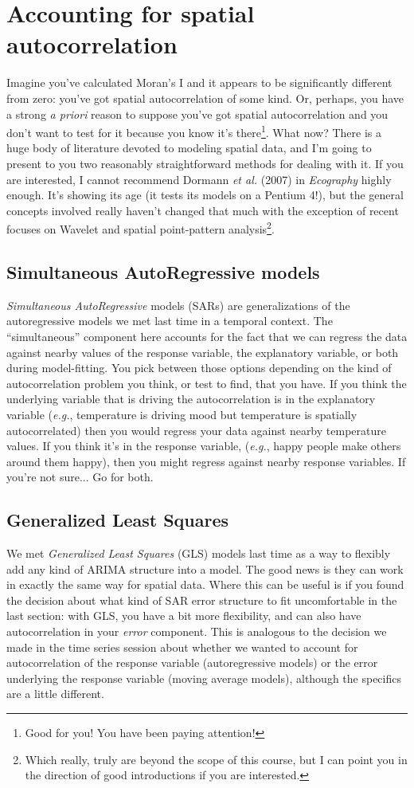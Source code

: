 \section{Accounting for spatial autocorrelation}
Imagine you've calculated Moran's I and it appears to be significantly
different from zero: you've got spatial autocorrelation of some
kind. Or, perhaps, you have a strong \emph{a priori} reason to suppose
you've got spatial autocorrelation and you don't want to test for it
because you know it's there\footnote{Good for you! You have been
  paying attention!}. What now? There is a huge body of literature
devoted to modeling spatial data, and I'm going to present to you two
reasonably straightforward methods for dealing with it. If you are
interested, I cannot recommend Dormann \emph{et al.} (2007) in
\emph{Ecography} highly enough. It's showing its age (it tests its
models on a Pentium 4!), but the general concepts involved really
haven't changed that much with the exception of recent focuses on
Wavelet and spatial point-pattern analysis\footnote{Which really,
  truly are beyond the scope of this course, but I can point you in
  the direction of good introductions if you are interested.}.

\subsection{Simultaneous AutoRegressive models}
\emph{Simultaneous AutoRegressive} models (SARs) are generalizations
of the autoregressive models we met last time in a temporal
context. The ``simultaneous'' component here accounts for the fact
that we can regress the data against nearby values of the response
variable, the explanatory variable, or both during model-fitting. You
pick between those options depending on the kind of autocorrelation
problem you think, or test to find, that you have. If you think the
underlying variable that is driving the autocorrelation is in the
explanatory variable (\emph{e.g.}, temperature is driving mood but
temperature is spatially autocorrelated) then you would regress your
data against nearby temperature values. If you think it's in the
response variable, (\emph{e.g.}, happy people make others around them
happy), then you might regress against nearby response variables. If
you're not sure... Go for both.

\subsection{Generalized Least Squares}
We met \emph{Generalized Least Squares} (GLS) models last time as a way to
flexibly add any kind of ARIMA structure into a model. The good news
is they can work in exactly the same way for spatial data. Where this
can be useful is if you found the decision about what kind of SAR
error structure to fit uncomfortable in the last section: with GLS,
you have a bit more flexibility, and can also have autocorrelation in
your \emph{error} component. This is analogous to the decision we made
in the time series session about whether we wanted to account for
autocorrelation of the response variable (autoregressive models) or
the error underlying the response variable (moving average models),
although the specifics are a little different.


